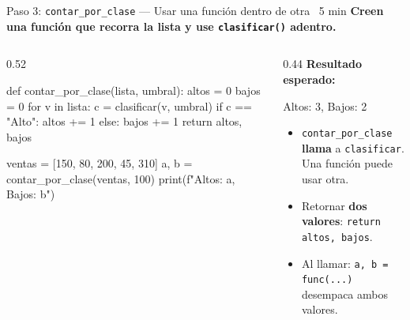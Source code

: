 \documentclass[aspectratio=169, 11pt]{beamer}
\begin{document}
\begin{frame}[fragile,shrink=28]{Paso 3: \texttt{contar\_por\_clase} --- Usar una función dentro de otra \hfill
    {\normalsize\color{arcaRed}\faClock\ 5 min}}
  \vspace{-6pt}
  {\footnotesize\color{arcaDark}\bfseries
    Creen una función que recorra la lista
    y use \texttt{clasificar()} adentro.}

  \vspace{4pt}
  \begin{columns}[T]
    \begin{column}{0.52\textwidth}
      \begin{pyblock}
def contar_por_clase(lista, umbral):
    altos = 0
    bajos = 0
    for v in lista:
        c = clasificar(v, umbral)
        if c == "Alto":
            altos += 1
        else:
            bajos += 1
    return altos, bajos

ventas = [150, 80, 200, 45, 310]
a, b = contar_por_clase(ventas, 100)
print(f"Altos: {a}, Bajos: {b}")
      \end{pyblock}
    \end{column}

    \begin{column}{0.44\textwidth}
      \vspace{2pt}
      {\scriptsize\color{textMuted}\bfseries Resultado esperado:}
      \begin{outputblock}
Altos: 3, Bajos: 2
      \end{outputblock}

      \vspace{4pt}
      {\scriptsize\color{textMuted}
      \begin{itemize}\setlength{\itemsep}{3pt}
        \item[{\color{arcaRed}\scriptsize\faArrowRight}]
          \texttt{contar\_por\_clase} \textbf{llama}
          a \texttt{clasificar}. Una función puede
          usar otra.
        \item[{\color{arcaRed}\scriptsize\faArrowRight}]
          Retornar \textbf{dos valores}:
          \texttt{return altos, bajos}.
        \item[{\color{arcaRed}\scriptsize\faLightbulb}]
          Al llamar: \texttt{a, b = func(...)}
          desempaca ambos valores.
      \end{itemize}
      }
    \end{column}
  \end{columns}
\end{frame}
\end{document}
